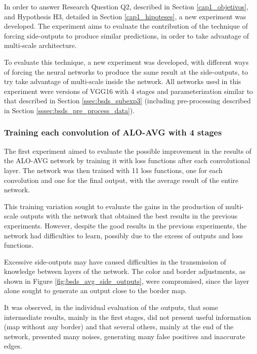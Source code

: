 In order to answer Research Question Q2, described in Section \ref{cap1_objetivos}, and Hypothesis H3, detailed in Section \ref{cap1_hipoteses}, a new experiment was developed.
The experiment aims to evaluate the contribution of the technique of forcing side-outputs to produce similar predictions, in order to take advantage of multi-scale architecture.

To evaluate this technique, a new experiment was developed, with different ways of forcing the neural networks to produce the same result at the side-outputs, to try take advantage of multi-scale inside the network.
All networks used in this experiment were versions of VGG16 with 4 stages and parameterization similar to that described in Section \ref{ssec:bsds_subexp3} (including  pre-processing described in Section \ref{sssec:bsds_pre_process_data}).

\subsubsection{Training each convolution of ALO-AVG with 4 stages}
\label{sssec:train_conv_alo_avg}

The first experiment aimed to evaluate the possible improvement in the results of the ALO-AVG network by training it with loss functions after each convolutional layer.
The network was then trained with 11 loss functions, one for each convolution and one for the final output, with the average result of the entire network.

This training variation sought to evaluate the gains in the production of multi-scale outputs with the network that obtained the best results in the previous experiments.
However, despite the good results in the previous experiments, the network had difficulties to learn, possibly due to the excess of outputs and loss functions.

Excessive side-outputs may have caused difficulties in the transmission of knowledge between layers of the network.
The color and border adjustments, as shown in Figure \ref{fig:bsds_avg_side_outputs}, were compromised, since the layer alone sought to generate an output close to the border map.

It was observed, in the individual evaluation of the outputs, that some intermediate results, mainly in the first stages, did not present useful information (map without any border) and that several others, mainly at the end of the network, presented many noises, generating many false positives and inaccurate edges.

